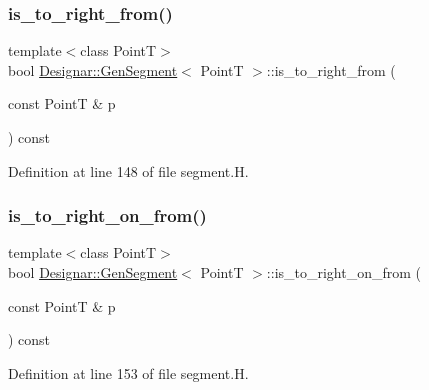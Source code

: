 \subsubsection{\texorpdfstring{is\+\_\+to\+\_\+right\+\_\+from()}{is\_to\_right\_from()}}
{\footnotesize\ttfamily template$<$class PointT$>$ \\
bool \hyperlink{class_designar_1_1_gen_segment}{Designar\+::\+Gen\+Segment}$<$ PointT $>$\+::is\+\_\+to\+\_\+right\+\_\+from (\begin{DoxyParamCaption}\item[{const PointT \&}]{p }\end{DoxyParamCaption}) const\hspace{0.3cm}{\ttfamily [inline]}}



Definition at line 148 of file segment.\+H.

\mbox{\label{class_designar_1_1_gen_segment_a7d2d5e4b54fa16fd953de345394e331b}} 
\subsubsection{\texorpdfstring{is\+\_\+to\+\_\+right\+\_\+on\+\_\+from()}{is\_to\_right\_on\_from()}}
{\footnotesize\ttfamily template$<$class PointT$>$ \\
bool \hyperlink{class_designar_1_1_gen_segment}{Designar\+::\+Gen\+Segment}$<$ PointT $>$\+::is\+\_\+to\+\_\+right\+\_\+on\+\_\+from (\begin{DoxyParamCaption}\item[{const PointT \&}]{p }\end{DoxyParamCaption}) const\hspace{0.3cm}{\ttfamily [inline]}}



Definition at line 153 of file segment.\+H.

\mbox{\label{class_designar_1_1_gen_segment_a9878c3c77157f54bf99ba33381bf0a5e}} 
